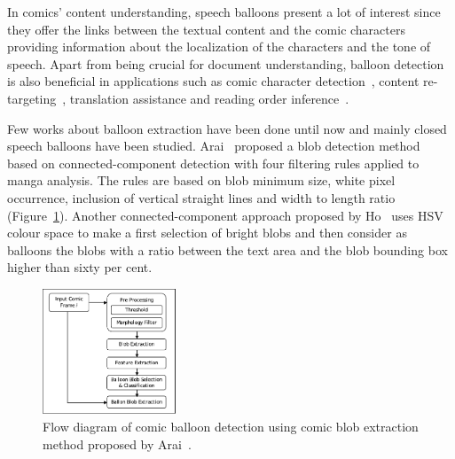 In comics' content understanding, speech balloons present a lot of interest since they offer the links between the textual content and the comic characters providing information about the localization of the characters and the tone of speech.
Apart from being crucial for document understanding, balloon detection is also beneficial in applications such as comic character detection~\cite{Sun2011}, content re-targeting~\cite{Matsui2011}, translation assistance and reading order inference~\cite{Guerin2012Ontologies}.

Few works about balloon extraction have been done until now and mainly closed speech balloons have been studied.
Arai~\cite{Arai11} proposed a blob detection method based on connected-component detection with four filtering rules applied to manga analysis.
The rules are based on blob minimum size, white pixel occurrence, inclusion of vertical straight lines and width to length ratio (Figure~\ref{fig:Arai_balloon_extraction_process}).
Another connected-component approach proposed by Ho~\cite{Ho2012} uses HSV colour space to make a first selection of bright blobs and then consider as balloons the blobs with a ratio between the text area and the blob bounding box higher than sixty per cent.


 \begin{figure}[!ht]  %
   \centering
  \includegraphics[trim= 0px 0px 0px 0px, clip, width=150px]{Arai_balloon_extraction_process.pdf}
  \caption[Flow diagram of comic balloon detection]{Flow diagram of comic balloon detection using comic blob extraction method proposed by Arai~\cite{Arai11}.}
  \label{fig:Arai_balloon_extraction_process}
 \end{figure}

